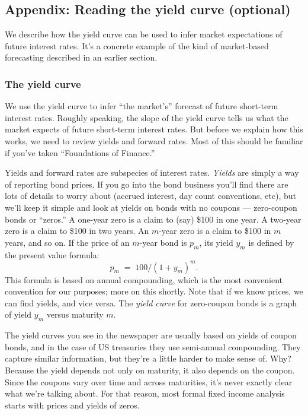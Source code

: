 \documentclass[letterpaper,12pt]{article}
\begin{document}
\newpage
\subsection*{Appendix:  Reading the yield curve (optional)}

\bigskip
We describe how the yield curve can be used to infer
market expectations of future interest rates.
It's a concrete example of the kind of market-based forecasting
described in an earlier section.


\subsubsection*{The yield curve}

We use the yield curve to infer ``the
market's'' forecast of future short-term interest rates.
Roughly speaking, the slope of
the yield curve tells us what the market expects of future
short-term interest rates. But before we explain how this works,
we need to review yields and forward rates.
Most of this should be familiar if you've taken
``Foundations of Finance.''

Yields and forward rates are subspecies of interest rates. {\it
Yields\/} are simply a way of reporting bond prices. If you go
into the bond business you'll find there are lots of details to
worry about (accrued interest, day count conventions, etc), but
we'll keep it simple and look at yields on bonds with no coupons
--- zero-coupon bonds or ``zeros.''  A one-year zero is a claim to (say) \$100 in
one year.  A two-year zero is a claim to \$100 in two years.  An
$m$-year zero is a claim to \$100 in $m$ years, and so on.  If the
price of an $m$-year bond is $p_m$, its yield $y_m$ is defined by
the present value formula:
\begin{equation}
        p_m  \;=\; 100/(1+y_m)^m.
        \label{eq:pv}
\end{equation}
This formula is based on annual compounding, which is the most
convenient convention for our purposes; more on this shortly. Note
that if we know prices, we can find yields, and vice versa. The
{\it yield curve\/} for zero-coupon bonds is a graph of yield
$y_m$ versus maturity $m$.


The yield curves you see in the newspaper are usually based on
yields of coupon bonds, and in the case of US treasuries they use
semi-annual compounding. They capture similar information, but
they're a little harder to make sense of.  Why?  Because the yield
depends not only on maturity, it also depends on the coupon. Since
the coupons vary over time and across maturities, it's never
exactly clear what we're talking about.  For that reason, most
formal fixed income analysis starts with prices and yields of
zeros.
\end{document}
